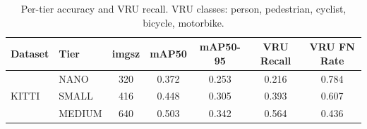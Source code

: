 \begin{table}[t]
\centering
\caption{Per-tier accuracy and VRU recall. VRU classes: person, pedestrian, cyclist, bicycle, motorbike.}
\label{tab:accuracy_per_tier}
\begin{tabular}{llccccc}
\toprule
Dataset & Tier & imgsz & mAP50 & mAP50-95 & VRU Recall & VRU FN Rate \\
\midrule
\multirow{3}{*}{KITTI} & NANO & 320 & 0.372 & 0.253 & 0.216 & 0.784 \\
 & SMALL & 416 & 0.448 & 0.305 & 0.393 & 0.607 \\
 & MEDIUM & 640 & 0.503 & 0.342 & 0.564 & 0.436 \\
\bottomrule
\end{tabular}
\end{table}